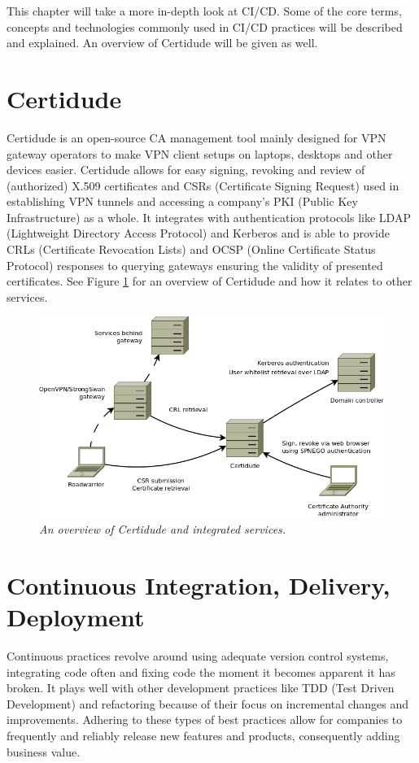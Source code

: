 This chapter will take a more in-depth look at CI/CD. Some of the core terms, concepts and technologies commonly used in CI/CD practices will be described and explained. An overview of Certidude will be given as well.

\section{Certidude}
Certidude is an open-source CA management tool mainly designed for VPN gateway operators to make VPN client setups on laptops, desktops and other devices easier.\cite{certidude} Certidude allows for easy signing, revoking and review of (authorized) X.509 certificates and CSRs (Certificate Signing Request) used in establishing VPN tunnels and accessing a company's PKI (Public Key Infrastructure) as a whole. It integrates with authentication protocols like LDAP (Lightweight Directory Access Protocol) and Kerberos and is able to provide CRLs (Certificate Revocation Lists) and OCSP (Online Certificate Status Protocol) responses to querying gateways ensuring the validity of presented certificates. See Figure \ref{fig:certidude} for an overview of Certidude and how it relates to other services.

\begin{figure}[ht]
    \centering
    \includegraphics[width=\textwidth]{figures/certidude2.png}
    \caption{\textit{An overview of Certidude and integrated services.}\cite{certidude}}
    \label{fig:certidude}
\end{figure}

\section{Continuous Integration, Delivery, Deployment}\label{sec:continuous-practices}
Continuous practices revolve around using adequate version control systems, integrating code often and fixing code the moment it becomes apparent it has broken. It plays well with other development practices like TDD (Test Driven Development) and refactoring because of their focus on incremental changes and improvements.\cite{ci-duvall} Adhering to these types of best practices allow for companies to frequently and reliably release new features and products, consequently adding business value.\cite{cicd-review}

